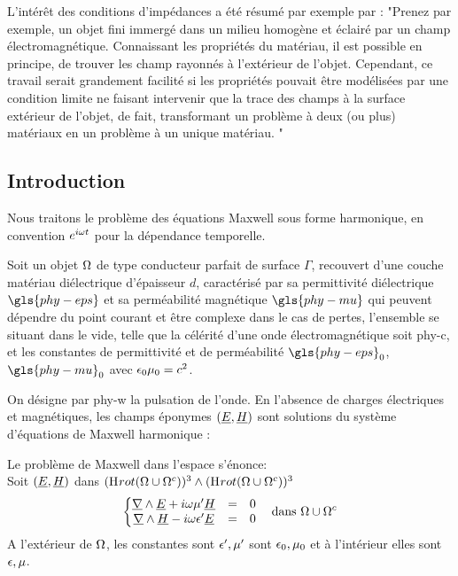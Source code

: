 
L’intérêt des conditions d'impédances a été résumé par exemple par \cite{senior_approximate_1995}:
"Prenez par exemple, un objet fini immergé dans un milieu homogène et éclairé par un champ électromagnétique.
Connaissant les propriétés du matériau, il est possible en principe, de trouver les champ rayonnés à l'extérieur de l'objet.
Cependant, ce travail serait grandement facilité si les propriétés pouvait être modélisées par une condition limite ne faisant intervenir que la trace des champs à la surface extérieur de l'objet, de fait, transformant un problème à deux (ou plus) matériaux en un problème à un unique matériau.
"

\subsection*{Introduction}
Nous traitons le problème des équations Maxwell sous forme harmonique, en convention $e^{i\omega t}$ pour la dépendance temporelle.


Soit un objet $\Omega$ de type conducteur parfait de surface $\Gamma$, recouvert d'une couche matériau diélectrique d'épaisseur $d$, caractérisé par sa permittivité diélectrique $\gls{phy-eps}$ et sa perméabilité magnétique $\gls{phy-mu}$ qui peuvent dépendre du point courant et être complexe dans le cas de pertes, l'ensemble se situant dans le vide, telle que la célérité d'une onde électromagnétique soit \gls{phy-c}, et les constantes de permittivité et de perméabilité $\gls{phy-eps}_0$, $\gls{phy-mu}_0$ avec $\epsilon_0\mu_0 = c^{2}$.


On désigne par \gls{phy-w} la pulsation de l'onde.
En l'absence de charges électriques et magnétiques, les champs éponymes $( \underline{E}, \underline{H} )$ sont solutions du système d'équations de Maxwell harmonique : 

Le problème de Maxwell dans l'espace s'énonce: \\

Soit $(\underline{E},\underline{H})$ dans $(\mathrm{H}_\mathrm{{}}{rot}(\Omega\cup\Omega^c))^3 \wedge (\mathrm{H}_\mathrm{{}}{rot}(\Omega\cup\Omega^c))^3$
\begin{equation}
\label{eq:pres_th:intro:maxwell}
\left\lbrace \begin{matrix}
\underline{\nabla} \wedge \underline{E} + i\omega\mu' \underline{H} &=& 0 \\
\underline{\nabla} \wedge \underline{H} - i\omega\epsilon' \underline{E} &=& 0 \\
\end{matrix} \right.
\quad \text{dans $\Omega\cup\Omega^c$}
\end{equation}
A l'extérieur de $\Omega$, les constantes sont $\epsilon',\mu'$ sont $\epsilon_0,\mu_0$ et à l'intérieur elles sont $\epsilon,\mu$.


